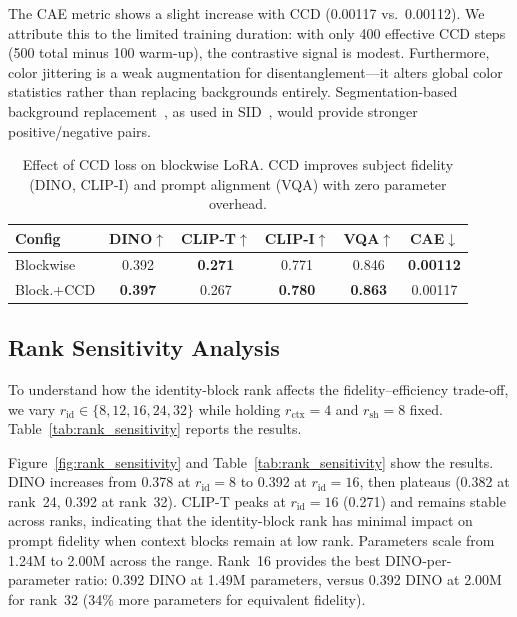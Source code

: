 \documentclass{article}
\begin{document}
The CAE metric shows a slight increase with CCD (0.00117 vs.\ 0.00112).
We attribute this to the limited training duration: with only 400 effective CCD steps (500 total minus 100 warm-up), the contrastive signal is modest.
Furthermore, color jittering is a weak augmentation for disentanglement---it alters global color statistics rather than replacing backgrounds entirely.
Segmentation-based background replacement~\citep{kirillov2023segment}, as used in SID~\citep{sid2024}, would provide stronger positive/negative pairs.

\begin{table}[t]
\caption{Effect of CCD loss on blockwise LoRA.
CCD improves subject fidelity (DINO, CLIP-I) and prompt alignment (VQA) with zero parameter overhead.}
\label{tab:ccd}
\vskip 0.1in
\begin{center}
\begin{small}
\begin{tabular}{lccccc}
\toprule
Config & DINO$\uparrow$ & CLIP-T$\uparrow$ & CLIP-I$\uparrow$ & VQA$\uparrow$ & CAE$\downarrow$ \\
\midrule
Blockwise & 0.392 & \textbf{0.271} & 0.771 & 0.846 & \textbf{0.00112} \\
Block.+CCD & \textbf{0.397} & 0.267 & \textbf{0.780} & \textbf{0.863} & 0.00117 \\
\bottomrule
\end{tabular}
\end{small}
\end{center}
\vskip -0.1in
\end{table}

\subsection{Rank Sensitivity Analysis}
\label{sec:rank_sensitivity}

To understand how the identity-block rank affects the fidelity--efficiency trade-off, we vary $r_{\text{id}} \in \{8, 12, 16, 24, 32\}$ while holding $r_{\text{ctx}}{=}4$ and $r_{\text{sh}}{=}8$ fixed.
Table~\ref{tab:rank_sensitivity} reports the results.

Figure~\ref{fig:rank_sensitivity} and Table~\ref{tab:rank_sensitivity} show the results.
DINO increases from 0.378 at $r_{\text{id}}{=}8$ to 0.392 at $r_{\text{id}}{=}16$, then plateaus (0.382 at rank~24, 0.392 at rank~32).
CLIP-T peaks at $r_{\text{id}}{=}16$ (0.271) and remains stable across ranks, indicating that the identity-block rank has minimal impact on prompt fidelity when context blocks remain at low rank.
Parameters scale from 1.24M to 2.00M across the range.
Rank~16 provides the best DINO-per-parameter ratio: 0.392 DINO at 1.49M parameters, versus 0.392 DINO at 2.00M for rank~32 (34\% more parameters for equivalent fidelity).
\end{document}
